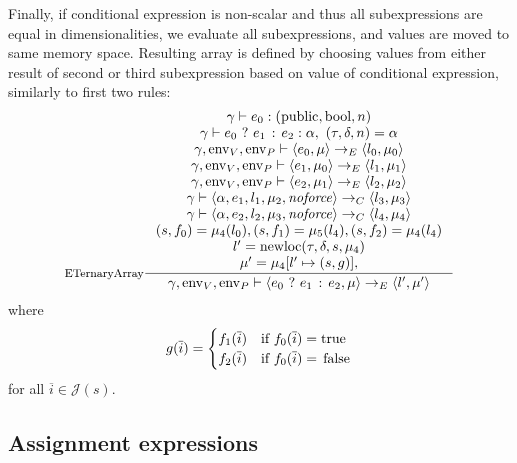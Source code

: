 \documentclass[a4paper, 10pt, draft]{report}
\DeclareMathOperator*{\env}{env}
\DeclareMathOperator*{\newloc}{newloc}
\DeclareMathOperator*{\noforce}{\mathit{noforce}}
\newcommand{\mycode}[1]{\ensuremath{\mbox{\lstinline{#1}}}}
\begin{document}
Finally, if conditional expression is non-scalar and thus all subexpressions
are equal in dimensionalities, we evaluate all subexpressions, and values are
moved to same memory space. Resulting array is defined by choosing values from
either result of second or third subexpression based on value of conditional
expression, similarly to first two rules:
\[ \inference[ETernaryArray]{
    \gamma |- e_0 : (\mycode{public}, \mycode{bool}, n) \\
    \gamma |- e_0\ \mycode{?}\ e_1\ \mycode{:}\ e_2 : \alpha,\ (\tau, \delta, n) = \alpha \\
    \gamma, \env_V, \env_P |- \left<e_0, \mu   \right> \to_E \left< l_0, \mu_0 \right> \\
    \gamma, \env_V, \env_P |- \left<e_1, \mu_0 \right> \to_E \left< l_1, \mu_1 \right> \\
    \gamma, \env_V, \env_P |- \left<e_2, \mu_1 \right> \to_E \left< l_2, \mu_2 \right> \\
    \gamma |- \left< \alpha , e_1, l_1, \mu_2 , \noforce \right> \to_C \left< l_3, \mu_3 \right> \\
    \gamma |- \left< \alpha , e_2, l_2, \mu_3 , \noforce \right> \to_C \left< l_4, \mu_4 \right> \\
    (s, f_0) = \mu_4(l_0), (s, f_1) = \mu_5(l_4), (s,f_2) = \mu_4(l_4) \\
    l' = \newloc(\tau, \delta, s, \mu_4) \\
    \mu' = \mu_4[l' \mapsto (s, g)],
}{
  \gamma, \env_V, \env_P |- \left< e_0\ \mycode{?}\ e_1\ \mycode{:}\ e_2, \mu \right> \to_E \left< l', \mu' \right>
}\]
where \[
g(\overline{i}) = \begin{cases}
f_1(\overline{i}) & \text{if}\ f_0(\overline{i}) = \mycode{true} \\
f_2(\overline{i}) & \text{if}\ f_0(\overline{i}) = \mycode{false}
\end{cases}
\] for all $ \overline{i} \in \mathcal{J}(s)$.
\vspace{0.5cm}


\subsection{Assignment expressions}\label{sec:semantics:expr:assign}
\end{document}
